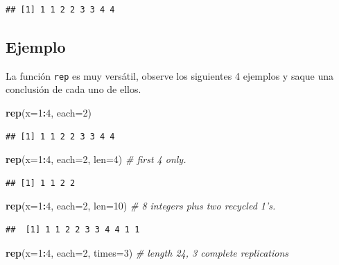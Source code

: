 \documentclass[10pt,]{krantz}
\makeatletter
\newenvironment{Shaded}{\begin{snugshade}}{\end{snugshade}}
\newcommand{\KeywordTok}[1]{\textcolor[rgb]{0.13,0.29,0.53}{\textbf{#1}}}
\newcommand{\DataTypeTok}[1]{\textcolor[rgb]{0.13,0.29,0.53}{#1}}
\newcommand{\DecValTok}[1]{\textcolor[rgb]{0.00,0.00,0.81}{#1}}
\newcommand{\CommentTok}[1]{\textcolor[rgb]{0.56,0.35,0.01}{\textit{#1}}}
\newcommand{\OperatorTok}[1]{\textcolor[rgb]{0.81,0.36,0.00}{\textbf{#1}}}
\newcommand{\NormalTok}[1]{#1}
\newenvironment{kframe}{%
\medskip{}
\setlength{\fboxsep}{.8em}
 \def\at@end@of@kframe{}%
 \ifinner\ifhmode%
  \def\at@end@of@kframe{\end{minipage}}%
  \begin{minipage}{\columnwidth}%
 \fi\fi%
 \def\FrameCommand##1{\hskip\@totalleftmargin \hskip-\fboxsep
 \colorbox{shadecolor}{##1}\hskip-\fboxsep
     \hskip-\linewidth \hskip-\@totalleftmargin \hskip\columnwidth}%
 \MakeFramed {\advance\hsize-\width
   \@totalleftmargin\z@ \linewidth\hsize
   \@setminipage}}%
 {\par\unskip\endMakeFramed%
 \at@end@of@kframe}
\renewenvironment{Shaded}{\begin{kframe}}{\end{kframe}}
\makeatother
\begin{document}
\begin{verbatim}
## [1] 1 1 2 2 3 3 4 4
\end{verbatim}

\subsection*{Ejemplo}\label{ejemplo-12}


La función \texttt{rep} es muy versátil, observe los siguientes 4
ejemplos y saque una conclusión de cada uno de ellos.

\begin{Shaded}
\begin{Highlighting}[]
\KeywordTok{rep}\NormalTok{(}\DataTypeTok{x=}\DecValTok{1}\OperatorTok{:}\DecValTok{4}\NormalTok{, }\DataTypeTok{each=}\DecValTok{2}\NormalTok{)}
\end{Highlighting}
\end{Shaded}

\begin{verbatim}
## [1] 1 1 2 2 3 3 4 4
\end{verbatim}

\begin{Shaded}
\begin{Highlighting}[]
\KeywordTok{rep}\NormalTok{(}\DataTypeTok{x=}\DecValTok{1}\OperatorTok{:}\DecValTok{4}\NormalTok{, }\DataTypeTok{each=}\DecValTok{2}\NormalTok{, }\DataTypeTok{len=}\DecValTok{4}\NormalTok{)    }\CommentTok{# first 4 only.}
\end{Highlighting}
\end{Shaded}

\begin{verbatim}
## [1] 1 1 2 2
\end{verbatim}

\begin{Shaded}
\begin{Highlighting}[]
\KeywordTok{rep}\NormalTok{(}\DataTypeTok{x=}\DecValTok{1}\OperatorTok{:}\DecValTok{4}\NormalTok{, }\DataTypeTok{each=}\DecValTok{2}\NormalTok{, }\DataTypeTok{len=}\DecValTok{10}\NormalTok{)   }\CommentTok{# 8 integers plus two recycled 1's.}
\end{Highlighting}
\end{Shaded}

\begin{verbatim}
##  [1] 1 1 2 2 3 3 4 4 1 1
\end{verbatim}

\begin{Shaded}
\begin{Highlighting}[]
\KeywordTok{rep}\NormalTok{(}\DataTypeTok{x=}\DecValTok{1}\OperatorTok{:}\DecValTok{4}\NormalTok{, }\DataTypeTok{each=}\DecValTok{2}\NormalTok{, }\DataTypeTok{times=}\DecValTok{3}\NormalTok{)  }\CommentTok{# length 24, 3 complete replications}
\end{Highlighting}
\end{Shaded}
\end{document}

